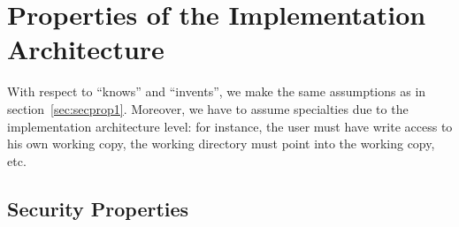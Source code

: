 


\section[Implementation Architecture]{Properties of the Implementation
  Architecture}\label{sec:secprop2}

With respect to ``knows'' and ``invents'', we make the same assumptions as in
section~\ref{sec:secprop1}. Moreover, we have to assume specialties due to the
implementation architecture level: for instance, the user must have write access
to his own working copy, the working directory must point into the working copy,
etc.


\subsection{Security Properties}

\vspace{1ex}\noindent


